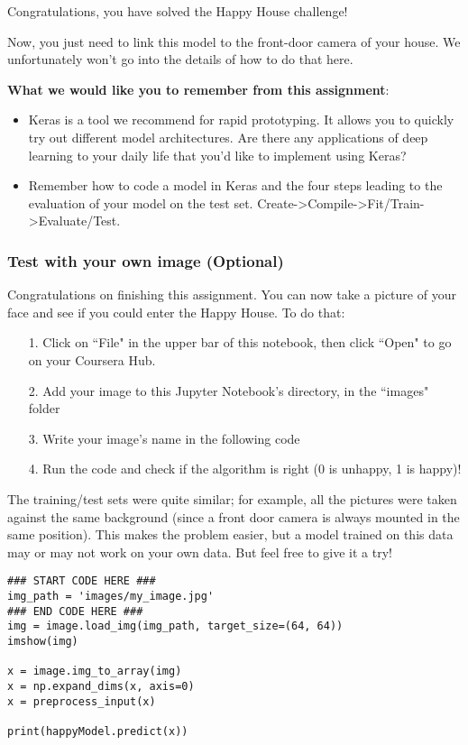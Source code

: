 Congratulations, you have solved the Happy House challenge!

Now, you just need to link this model to the front-door camera of your house. We unfortunately won't go into the details of how to do that here.


{\color{red}\textbf {What we would like you to remember from this assignment}:
\begin{itemize}
\item Keras is a tool we recommend for rapid prototyping. It allows you to quickly try out different model architectures. Are there any applications of deep learning to your daily life that you'd like to implement using Keras?
\item Remember how to code a model in Keras and the four steps leading to the evaluation of your model on the test set. Create->Compile->Fit/Train->Evaluate/Test.
\end{itemize}
}




\subsubsection{Test with your own image (Optional)}

Congratulations on finishing this assignment. You can now take a picture of your face and see if you could enter the Happy House. To do that:
\begin{itemize}
\item[1.] Click on ``File" in the upper bar of this notebook, then click ``Open" to go on your Coursera Hub.
\item[2.] Add your image to this Jupyter Notebook's directory, in the ``images" folder
\item[3.] Write your image's name in the following code
\item[4.] Run the code and check if the algorithm is right (0 is unhappy, 1 is happy)!
\end{itemize}

The training/test sets were quite similar; for example, all the pictures were taken against the same background (since a front door camera is always mounted in the same position). This makes the problem easier, but a model trained on this data may or may not work on your own data. But feel free to give it a try!

\begin{verbatim}
### START CODE HERE ###
img_path = 'images/my_image.jpg'
### END CODE HERE ###
img = image.load_img(img_path, target_size=(64, 64))
imshow(img)

x = image.img_to_array(img)
x = np.expand_dims(x, axis=0)
x = preprocess_input(x)

print(happyModel.predict(x))
\end{verbatim}

